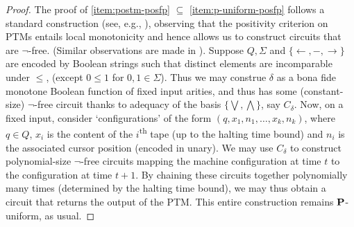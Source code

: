 \documentclass{lmcs}
\begin{document}
\begin{proof}
	The proof of \eqref{item:postm-posfp} $\subseteq$ \eqref{item:p-uniform-posfp} follows a standard construction (see, e.g., \cite{Papadimitriou07}), observing that the positivity criterion on PTMs entails local monotonicity and hence allows us to construct circuits that are $\neg$-free. (Similar observations are made in \cite{Grigni:1992:MC:167687.167706,grigni1991structure,LautemannSS96:on-pos-p,LSS98}).
	Suppose $Q, \Sigma$ and $\{\leftarrow, - , \rightarrow \}$ are encoded by Boolean strings such that distinct elements are incomparable under $\leq$, (except $0\leq 1 $ for $0,1 \in \Sigma$). Thus we may construe $\delta $ as a bona fide monotone Boolean function of fixed input arities, and thus has some (constant-size) $\neg$-free circuit thanks to adequacy of the basis $\{ \bigvee, \bigwedge \}$, say $C_\delta$.
	Now, on a fixed input, consider `configurations' of the form $(q, x_1, n_1, \dots , x_k, n_k)$, where $q \in Q$, $x_i$ is the content of the $i$\textsuperscript{th} tape (up to the halting time bound) and $n_i$ is the associated cursor position (encoded in unary). 
	We may use $C_\delta$ to construct polynomial-size $\neg$-free circuits mapping the machine configuration at time $t$ to the configuration at time $t+1$.
	By chaining these circuits together polynomially many times (determined by the halting time bound), we may thus obtain a circuit that returns the output of the PTM. This entire construction remains $\mathbf{P}$-uniform, as usual.


\end{proof}
\end{document}
